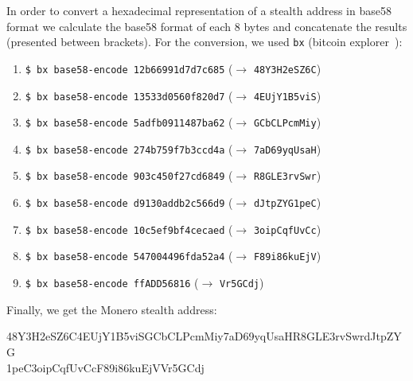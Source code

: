 In order to convert a hexadecimal representation of a stealth address in base58 format we calculate the base58 format of each 8 bytes and concatenate the results (presented between brackets). For the conversion, we used \verb|bx| (bitcoin explorer~\cite{bx}):

\begin{enumerate}
  \item \verb|$ bx base58-encode 12b66991d7d7c685| ($\rightarrow$ \verb|48Y3H2eSZ6C|)
  \item \verb|$ bx base58-encode 13533d0560f820d7| ($\rightarrow$ \verb|4EUjY1B5viS|)
  \item \verb|$ bx base58-encode 5adfb0911487ba62| ($\rightarrow$ \verb|GCbCLPcmMiy|)
  \item \verb|$ bx base58-encode 274b759f7b3ccd4a| ($\rightarrow$ \verb|7aD69yqUsaH|)
  \item \verb|$ bx base58-encode 903c450f27cd6849| ($\rightarrow$ \verb|R8GLE3rvSwr|)
  \item \verb|$ bx base58-encode d9130addb2c566d9| ($\rightarrow$ \verb|dJtpZYG1peC|)
  \item \verb|$ bx base58-encode 10c5ef9bf4cecaed| ($\rightarrow$ \verb|3oipCqfUvCc|)
  \item \verb|$ bx base58-encode 547004496fda52a4| ($\rightarrow$ \verb|F89i86kuEjV|)
  \item \verb|$ bx base58-encode ffADD56816| ($\rightarrow$ \verb|Vr5GCdj|)
\end{enumerate}

Finally, we get the Monero stealth address:
\begin{tcolorbox}[colback=green!5!white,colframe=green!65!black]
  \small{48Y3H2eSZ6C4EUjY1B5viSGCbCLPcmMiy7aD69yqUsaHR8GLE3rvSwrdJtpZYG\\
  1peC3oipCqfUvCcF89i86kuEjVVr5GCdj}
\end{tcolorbox}
